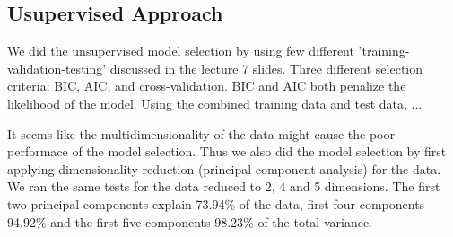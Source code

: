 \subsection{Usupervised Approach}
We did the unsupervised model selection by using few different 'training-validation-testing' discussed in the lecture 7 slides. Three different selection criteria: BIC, AIC, and cross-validation. BIC and AIC both penalize the likelihood of the model. Using the combined training data and test data, ...

It seems like the multidimensionality of the data might cause the poor performace of the model selection. Thus we also did the model selection by first applying dimensionality reduction (principal component analysis) for the data. We ran the same tests for the data reduced to 2, 4 and 5 dimensions. The first two principal components explain 73.94\% of the data, first four components 94.92\% and the first five components 98.23\% of the total variance.


